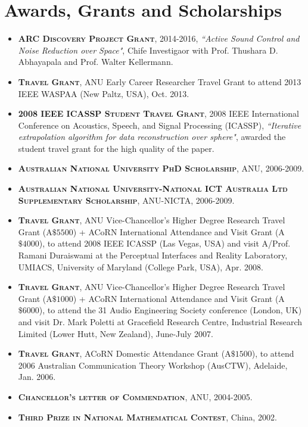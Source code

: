 \documentclass[11pt]{article}
\begin{document}
\section*{Awards, Grants and Scholarships}
%
\begin{itemize}
%

\item \textsc{\textbf{ARC Discovery Project Grant}}, 2014-2016, \emph{``Active Sound Control and Noise Reduction over Space"}, Chife Investigaor with Prof. Thushara D. Abhayapala and Prof. Walter Kellermann.

\item \textsc{\textbf{Travel Grant}}, ANU Early Career Researcher Travel Grant to attend 2013 IEEE WASPAA (New Paltz, USA), Oct. 2013.

\item \textsc{\textbf{2008 IEEE ICASSP Student Travel Grant}}, 2008 IEEE International Conference on Acoustics,
Speech, and Signal Processing (ICASSP), \emph{``Iterative extrapolation algorithm for data reconstruction over sphere"}, awarded the student
travel grant for the high quality of the paper.

\item \textsc{\textbf{Australian National University PhD Scholarship}}, ANU, 2006-2009.

\item \textsc{\textbf{Australian National University-National ICT Australia Ltd Supplementary Scholarship}},
ANU-NICTA, 2006-2009.

\item \textsc{\textbf{Travel Grant}}, ANU Vice-Chancellor's Higher Degree Research Travel Grant (A$\$5500$)
+ ACoRN International Attendance and Visit Grant (A$\$4000$), to attend 2008 IEEE ICASSP (Las Vegas, USA) and visit A/Prof. Ramani Duraiswami at
the Perceptual Interfaces and Reality Laboratory, UMIACS, University of Maryland (College Park, USA), Apr. 2008.

\item \textsc{\textbf{Travel Grant}}, ANU Vice-Chancellor's Higher Degree Research Travel Grant (A$\$1000$)
+ ACoRN International Attendance and Visit Grant (A$\$6000$), to attend the 31 Audio Engineering Society conference (London, UK) and visit Dr.
Mark Poletti at Gracefield Research Centre, Industrial Research Limited (Lower Hutt, New Zealand), June-July 2007.

\item \textsc{\textbf{Travel Grant}}, ACoRN Domestic Attendance Grant (A$\$1500$), to attend 2006 Australian Communication Theory Workshop
(AusCTW), Adelaide, Jan. 2006.

\item \textsc{\textbf{Chancellor's letter of Commendation}}, ANU, 2004-2005.

\item \textsc{\textbf{Third Prize in National Mathematical Contest}}, China, 2002.

\end{itemize}
\end{document}
